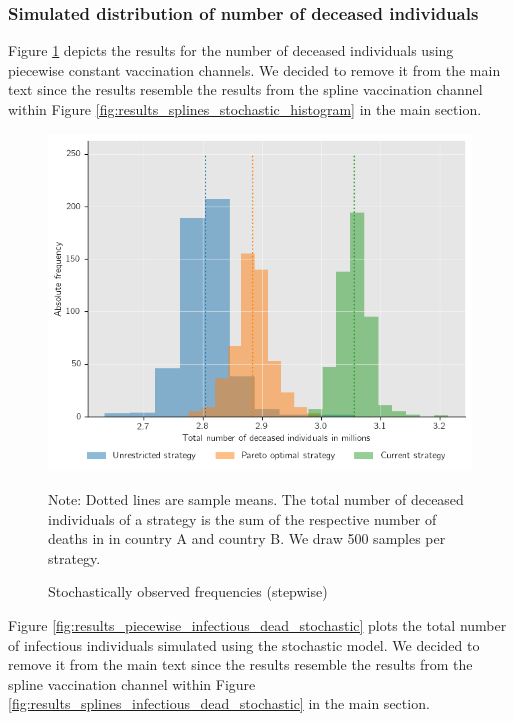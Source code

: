 





\clearpage
\subsubsection{Simulated distribution of number of deceased individuals}
\label{A:simulated_distr}

Figure \ref{fig:results_piecewise_stochastic_histogram} depicts the results for the number of deceased individuals using piecewise constant vaccination channels. We decided to remove it from the main text since the results resemble the results from the spline vaccination channel within Figure \ref{fig:results_splines_stochastic_histogram} in the main section.
\begin{figure}[h!]
\centering
\includegraphics[scale=0.65]{images/piecewise_stochastic_histogram.png}\\
\begin{flushleft}
\scriptsize{Note:} Dotted lines are sample means. The total number of deceased individuals of a strategy is the sum of the respective number of deaths in in country A and country B. We draw 500 samples per strategy. 
\end{flushleft}
\caption{Stochastically observed frequencies (stepwise)}
\label{fig:results_piecewise_stochastic_histogram}
\end{figure}

Figure \ref{fig:results_piecewise_infectious_dead_stochastic} plots the total number of infectious individuals simulated using the stochastic model. We decided to remove it from the main text since the results resemble the results from the spline vaccination channel within Figure \ref{fig:results_splines_infectious_dead_stochastic} in the main section.\\

